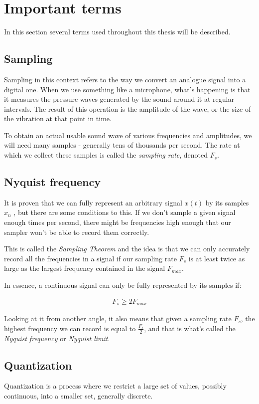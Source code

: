 \section{Important terms}
In this section several terms used throughout this thesis will be described.

\subsection{Sampling}
Sampling in this context refers to the way we convert an analogue signal into a digital one. When we use something like a microphone, what's happening is that it measures the pressure waves generated by the sound around it at regular intervals. The result of this operation is the amplitude of the wave, or the size of the vibration at that point in time.

To obtain an actual usable sound wave of various frequencies and amplitudes, we will need many samples - generally tens of thousands per second. The rate at which we collect these samples is called the \emph{sampling rate}, denoted $F_s$.

\subsection{Nyquist frequency}
It is proven that we can fully represent an arbitrary signal $x(t)$ by its samples $x_n$ \cite{bosi_goldberg_2003}, but there are some conditions to this. If we don't sample a given signal enough times per second, there might be frequencies high enough that our sampler won't be able to record them correctly.

This is called the \emph{Sampling Theorem} and the idea is that we can only accurately record all the frequencies in a signal if our sampling rate $F_s$ is at least twice as large as the largest frequency contained in the signal $F_{max}$. \cite{shannon_sampling_1991}

In essence, a continuous signal can only be fully represented by its samples if:

\begin{align}
F_s \ge 2F_{max}
\end{align}

Looking at it from another angle, it also means that given a sampling rate $F_s$, the highest frequency we can record is equal to $\frac{F_s}{2}$, and that is what's called the \emph{Nyquist frequency} or \emph{Nyquist limit}.

\subsection{Quantization}
Quantization is a process where we restrict a large set of values, possibly continuous, into a smaller set, generally discrete.

